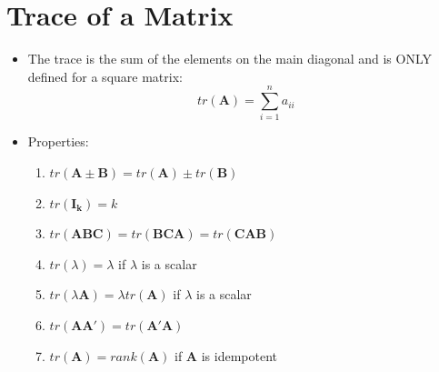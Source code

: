 \documentclass[11pt]{article}
\theoremstyle{definition}
\theoremstyle{remark}
\begin{document}
\section{Trace of a Matrix}
\begin{itemize}
\item The trace is the sum of the elements on the main diagonal and is ONLY defined for a square matrix:
$$
tr(\mathbf{A}) = \sum_{i=1}^{n} a_{ii}
$$
\item Properties:
\begin{enumerate}
\item $tr(\mathbf{A\pm B}) = tr(\mathbf{A}) \pm tr(\mathbf{B})$
\item $tr(\mathbf{I_k}) = k$
\item $tr(\mathbf{ABC}) = tr(\mathbf{BCA}) = tr(\mathbf{CAB})$
\item $tr(\lambda) = \lambda$ if $\lambda$ is a scalar
\item $tr(\lambda \mathbf{A}) = \lambda tr(\mathbf{A})$ if $\lambda$ is a scalar
\item $tr(\mathbf{AA'}) = tr(\mathbf{A'A})$
\item $tr(\mathbf{A}) = rank(\mathbf{A})$ if \textbf{A} is idempotent
\end{enumerate}
\end{itemize}
\end{document}
